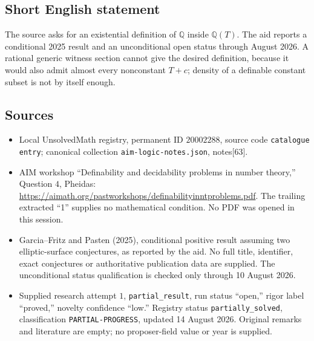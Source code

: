 \documentclass[11pt]{article}
\newcommand{\Q}{\mathbb{Q}}
\begin{document}
\subsection{Short English statement}
The source asks for an existential definition of \(\Q\) inside \(\Q(T)\). The aid reports a conditional 2025 result and an unconditional open status through August 2026. A rational generic witness section cannot give the desired definition, because it would also admit almost every nonconstant \(T+c\); density of a definable constant subset is not by itself enough.
\subsection{Sources}
\begin{itemize}
\item Local UnsolvedMath registry, permanent ID \(20002288\), source code \texttt{catalogue entry}; canonical collection \texttt{aim-logic-notes.json}, notes[63].
\item AIM workshop ``Definability and decidability problems in number theory,'' Question \(4\), Pheidas: \url{https://aimath.org/pastworkshops/definabilityinntproblems.pdf}. The trailing extracted ``1'' supplies no mathematical condition. No PDF was opened in this session.
\item Garcia--Fritz and Pasten (2025), conditional positive result assuming two elliptic-surface conjectures, as reported by the aid. No full title, identifier, exact conjectures or authoritative publication data are supplied. The unconditional status qualification is checked only through 10 August 2026.
\item Supplied research attempt \(1\), \texttt{partial\_result}, run status ``open,'' rigor label ``proved,'' novelty confidence ``low.'' Registry status \texttt{partially\_solved}, classification \texttt{PARTIAL-PROGRESS}, updated 14 August 2026. Original remarks and literature are empty; no proposer-field value or year is supplied.
\end{itemize}
\end{document}
